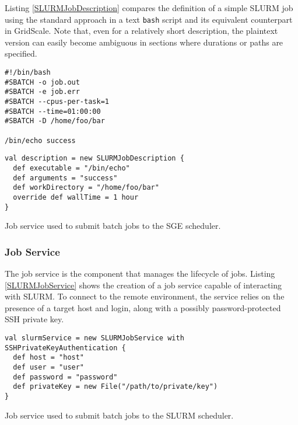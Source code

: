 Listing \ref{SLURMJobDescription} compares the definition of a simple SLURM job using the standard approach in a text \verb|bash| script and its equivalent counterpart in GridScale. Note that, even for a relatively short description, the plaintext version can easily become ambiguous in sections where durations or paths are specified.

\begin{listing}[h]
	\centering
	\begin{minipage}[b]{5.03cm}
		\begin{verbatim}
#!/bin/bash
#SBATCH -o job.out
#SBATCH -e job.err
#SBATCH --cpus-per-task=1 
#SBATCH --time=01:00:00
#SBATCH -D /home/foo/bar

/bin/echo success
        \end{verbatim}
	\end{minipage}
	\hspace{0.5cm}
    \begin{minipage}[b]{8.29cm}
		\begin{verbatim}
val description = new SLURMJobDescription { 
  def executable = "/bin/echo"
  def arguments = "success"
  def workDirectory = "/home/foo/bar"
  override def wallTime = 1 hour
}
		\end{verbatim}
	\end{minipage}
	\caption{Job service used to submit batch jobs to the SGE scheduler.}
	\label{SLURMJobDescription}
\end{listing}

\subsubsection{Job Service}

The job service is the component that manages the lifecycle of jobs. Listing \ref{SLURMJobService} shows the creation of a job service capable of interacting with SLURM. To connect to the remote environment, the service relies on the presence of a target host and login, along with a possibly password-protected SSH private key.

\begin{listing}[h]
	\centering
	\begin{minipage}{14cm}
		\begin{verbatim}
val slurmService = new SLURMJobService with SSHPrivateKeyAuthentication {
  def host = "host"
  def user = "user"
  def password = "password"
  def privateKey = new File("/path/to/private/key")
}
		\end{verbatim}
	\end{minipage}
	\caption{Job service used to submit batch jobs to the SLURM scheduler.}
	\label{SLURMJobService}
\end{listing}

